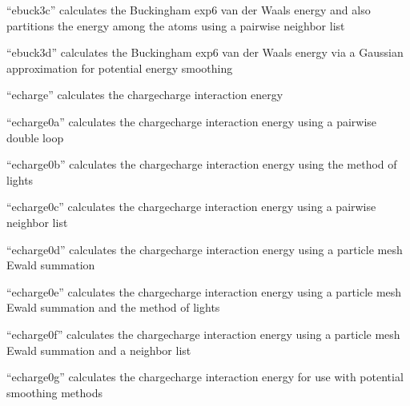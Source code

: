 \documentclass[letterpaper,11pt,english]{sphinxmanual}
\begin{document}
\sphinxAtStartPar
{}

\sphinxAtStartPar
“ebuck3c” calculates the Buckingham exp\sphinxhyphen{}6 van der Waals energy and also partitions the energy among the atoms using a pairwise neighbor list

\sphinxAtStartPar
{}

\sphinxAtStartPar
“ebuck3d” calculates the Buckingham exp\sphinxhyphen{}6 van der Waals energy via a Gaussian approximation for potential energy smoothing

\sphinxAtStartPar
{}

\sphinxAtStartPar
“echarge” calculates the charge\sphinxhyphen{}charge interaction energy

\sphinxAtStartPar
{}

\sphinxAtStartPar
“echarge0a” calculates the charge\sphinxhyphen{}charge interaction energy using a pairwise double loop

\sphinxAtStartPar
{}

\sphinxAtStartPar
“echarge0b” calculates the charge\sphinxhyphen{}charge interaction energy using the method of lights

\sphinxAtStartPar
{}

\sphinxAtStartPar
“echarge0c” calculates the charge\sphinxhyphen{}charge interaction energy using a pairwise neighbor list

\sphinxAtStartPar
{}

\sphinxAtStartPar
“echarge0d” calculates the charge\sphinxhyphen{}charge interaction energy using a particle mesh Ewald summation

\sphinxAtStartPar
{}

\sphinxAtStartPar
“echarge0e” calculates the charge\sphinxhyphen{}charge interaction energy using a particle mesh Ewald summation and the method of lights

\sphinxAtStartPar
{}

\sphinxAtStartPar
“echarge0f” calculates the charge\sphinxhyphen{}charge interaction energy using a particle mesh Ewald summation and a neighbor list

\sphinxAtStartPar
{}

\sphinxAtStartPar
“echarge0g” calculates the charge\sphinxhyphen{}charge interaction energy for use with potential smoothing methods
\end{document}
